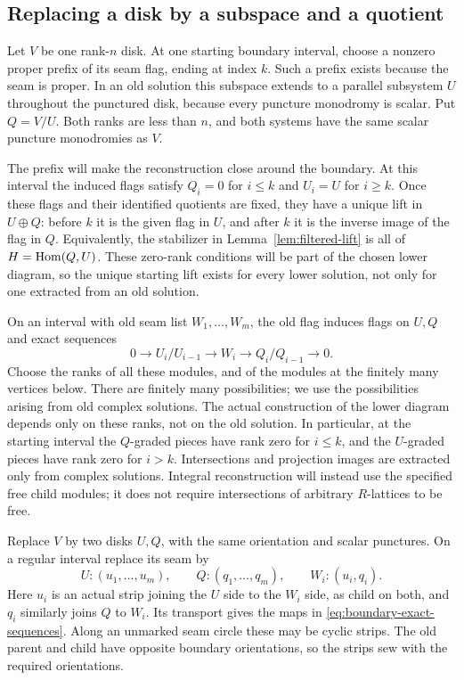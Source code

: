 \subsection{Replacing a disk by a subspace and a quotient}

Let $V$ be one rank-$n$ disk.  At one starting boundary interval,
choose a nonzero proper prefix of its seam flag, ending at index $k$.
Such a prefix exists because the seam is proper.  In an old solution
this subspace extends to a parallel subsystem $U$ throughout the
punctured disk, because every puncture monodromy is scalar.  Put
$Q=V/U$.  Both ranks are less than $n$, and both systems have the
same scalar puncture monodromies as $V$.

The prefix will make the reconstruction close around the boundary.
At this interval the induced flags satisfy $Q_i=0$ for $i\leq k$
and $U_i=U$ for $i\geq k$.  Once these flags and their identified
quotients are fixed, they have a unique lift in $U\oplus Q$: before
$k$ it is the given flag in $U$, and after $k$ it is the inverse
image of the flag in $Q$.  Equivalently, the stabilizer in
Lemma~\ref{lem:filtered-lift} is all of $H=\operatorname{Hom}(Q,U)$.
These zero-rank conditions will be part of the chosen lower diagram,
so the unique starting lift exists for every lower solution, not only
for one extracted from an old solution.

On an interval with old seam list $W_1,\ldots,W_m$, the old flag
induces flags on $U,Q$ and exact sequences
\begin{equation}\label{eq:boundary-exact-sequences}
 0\longrightarrow U_i/U_{i-1}\longrightarrow W_i
 \longrightarrow Q_i/Q_{i-1}\longrightarrow0.
\end{equation}
Choose the ranks of all these modules, and of the modules at the
finitely many vertices below.  There are finitely many possibilities;
we use the possibilities arising from old complex solutions.  The
actual construction of the lower diagram depends only on these
ranks, not on the old solution.  In particular, at the starting
interval the $Q$-graded pieces have rank zero for $i\leq k$, and the
$U$-graded pieces have rank zero for $i>k$.
Intersections and projection images are extracted only from complex
solutions.  Integral reconstruction will instead use the specified
free child modules; it does not require intersections of arbitrary
$R$-lattices to be free.

Replace $V$ by two disks $U,Q$, with the same orientation and scalar
punctures.  On a regular interval replace its seam by
\[
 U:(u_1,\ldots,u_m),\qquad
 Q:(q_1,\ldots,q_m),\qquad
 W_i:(u_i,q_i).
\]
Here $u_i$ is an actual strip joining the $U$ side to the $W_i$
side, as child on both, and $q_i$ similarly joins $Q$ to $W_i$.
Its transport gives the maps in
\eqref{eq:boundary-exact-sequences}.  Along an unmarked seam circle
these may be cyclic strips.  The old parent and child have opposite
boundary orientations, so the strips sew with the required
orientations.


